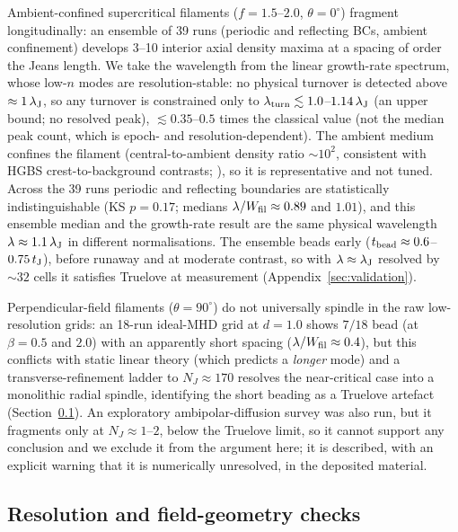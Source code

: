 \documentclass[usenatbib,twoside,twocolumn]{mnras}
\begin{document}
Ambient-confined supercritical filaments ($f=1.5$--$2.0$, $\theta=0^\circ$) fragment longitudinally: an ensemble of 39 runs (periodic and reflecting BCs, ambient confinement) develops 3--10 interior axial density maxima at a spacing of order the Jeans length. We take the wavelength from the linear growth-rate spectrum, whose low-$n$ modes are resolution-stable: no physical turnover is detected above $\approx1\,\lambda_{\rm J}$, so any turnover is constrained only to $\lambda_{\rm turn}\lesssim1.0$--$1.14\,\lambda_{\rm J}$ (an upper bound; no resolved peak), $\lesssim0.35$--$0.5$ times the classical value (not the median peak count, which is epoch- and resolution-dependent). The ambient medium confines the filament (central-to-ambient density ratio $\sim10^2$, consistent with HGBS crest-to-background contrasts; \citealt{Arzoumanian2019}), so it is representative  and not tuned. Across the 39 runs periodic and reflecting boundaries are statistically indistinguishable (KS $p=0.17$; medians $\lambda/W_{\rm fil}\approx0.89$ and $1.01$), and this ensemble median and the growth-rate result are the same physical wavelength $\lambda\approx1.1\,\lambda_{\rm J}$ in different normalisations. The ensemble beads early ($t_{\rm bead}\approx0.6$--$0.75\,t_{\rm J}$), before runaway and at moderate contrast, so with $\lambda\approx\lambda_{\rm J}$ resolved by ${\sim}32$ cells it satisfies Truelove at measurement (Appendix~\ref{sec:validation}).

Perpendicular-field filaments ($\theta=90^\circ$) do not universally spindle in the raw low-resolution grids: an 18-run ideal-MHD grid at $d=1.0$ shows $7/18$ bead (at $\beta=0.5$ and $2.0$) with an apparently short spacing ($\lambda/W_{\rm fil}\approx0.4$), but this conflicts with static linear theory (which predicts a \emph{longer} mode) and a transverse-refinement ladder to $N_J\approx170$ resolves the near-critical case into a monolithic radial spindle, identifying the short beading as a Truelove artefact (Section~\ref{sec:optional_tests}). An exploratory ambipolar-diffusion survey was also run, but it fragments only at $N_J\approx1$--$2$, below the Truelove limit, so it cannot support any conclusion and we exclude it from the argument here; it is described, with an explicit warning that it is numerically unresolved, in the deposited material.

\subsection{Resolution and field-geometry checks}
\label{sec:optional_tests}
\end{document}
